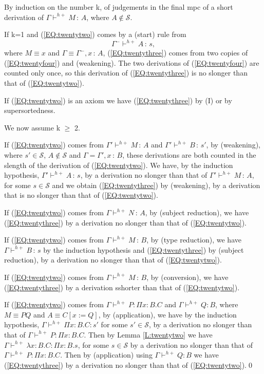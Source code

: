 \documentclass{LMCS}
\def\:{\mathbin{\,:\,}}
\begin{document}
\proof By induction on the number k, of judgements in the final mpc of
  a short derivation of $\Gamma\vdash^{h+} M\:A$, where $A\not\in
 \mathcal S$.

If k=1 and (\ref{EQ:twentytwo}) comes by a (start) rule from
\begin{equation}\label{EQ:twentyfour}
 \Gamma^-\vdash^{h+} A\:s,
\end{equation}
  where $M\equiv x$ and $\Gamma\equiv\Gamma^-, x\:A$,
  (\ref{EQ:twentythree}) comes from two copies of
  (\ref{EQ:twentyfour}) and (weakening). The two derivations of
  (\ref{EQ:twentyfour}) are counted only once, so this derivation of
  (\ref{EQ:twentythree}) is no slonger than that of
  (\ref{EQ:twentytwo}).

  If (\ref{EQ:twentytwo}) is an axiom we have (\ref{EQ:twentythree})
  by (I) or by supersortedness.

  We now assume k $\ge$ 2.

  If (\ref{EQ:twentytwo}) comes from $\Gamma'\vdash^{h+} M\:A$ and
  $\Gamma'\vdash^{h+} B\:s'$, by (weakening), where $s'\in {\mathcal
    S}$, $A\not\in {\mathcal S}$ and $\Gamma =\Gamma', x\:B$, these
  derivations are both counted in the slength of the derivation of
  (\ref{EQ:twentytwo}). We have, by the induction hypothesis, $\Gamma'
 \vdash^{h+} A\:s$, by a derivation no slonger than that of $\Gamma'
 \vdash^{h+} M\:A$, for some $s\in {\mathcal S}$ and we obtain
  (\ref{EQ:twentythree}) by (weakening), by a derivation that is no
  slonger than that of (\ref{EQ:twentytwo}).

  If (\ref{EQ:twentytwo}) comes from $\Gamma\vdash^{h+} N\:A$, by
  (subject reduction), we have (\ref{EQ:twentythree}) by a derivation
  no slonger than that of (\ref{EQ:twentytwo}).

  If (\ref{EQ:twentytwo}) comes from $\Gamma\vdash^{h+} M\:B$, by
  (type reduction), we have $\Gamma\vdash^{h+} B\:s$ by the induction
  hypothesis and (\ref{EQ:twentythree}) by (subject reduction), by a
  derivation no slonger than that of (\ref{EQ:twentytwo}).

  If (\ref{EQ:twentytwo}) comes from $\Gamma\vdash^{h+} M\:B$, by
  (conversion), we have (\ref{EQ:twentythree}) by a derivation
  sshorter than that of (\ref{EQ:twentytwo}).

  If (\ref{EQ:twentytwo}) comes from $\Gamma\vdash^{h+} P:\Pi
  x{:}B.C$ and $\Gamma\vdash^{h+} Q:B$, where $M\equiv PQ$ and
  $A\equiv C[x:=Q]$, by (application), we have by the induction
  hypothesis, $\Gamma\vdash^{h+}\Pi x{:}B.C:s'$ for some $s'\in
 \mathcal S$, by a derivation no slonger than that of $\Gamma
 \vdash^{h+} P:\Pi x{:}B.C$. Then by Lemma \ref{L:twentytwo} we have
  $\Gamma\vdash^{h+}\lambda x{:}B.C :\Pi x{:}B.s$, for some $s\in
  {\mathcal S}$ by a derivation no slonger than that of $\Gamma
 \vdash^{h+} P:\Pi x{:}B.C$. Then by (application) using $\Gamma
 \vdash^{h+} Q:B$ we have (\ref{EQ:twentythree}) by a derivation no
  slonger than that of (\ref{EQ:twentytwo}).\qed
\end{document}
